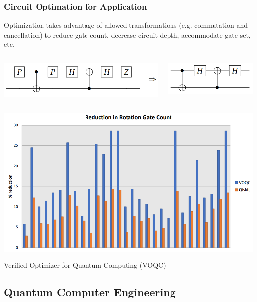 \documentclass[handout]{beamer}
\begin{document}
\begin{frame}
  \frametitle{Circuit Optimation for Application}
  Optimization takes advantage of allowed transformations (e.g. commutation
  and cancellation) to reduce gate count, decrease circuit depth,
  accommodate gate set, etc. 
  \begin{columns}
    \includegraphics[width=\linewidth]{Graphics/Q-cancellation-optimizer.png}

    \includegraphics[width=\linewidth]{Graphics/Q-cancellation-optimized.png}
  \end{columns}
  \begin{center}
    \vspace*{-\baselineskip}
    \includegraphics[width=0.55\linewidth]{Graphics/Rotation-gate-reduction-VOQC.png}
  \end{center}

  Verified Optimizer for Quantum Computing (VOQC)~\cite{VOQC}
\end{frame}

\subsection{Quantum Computer Engineering}
\end{document}
